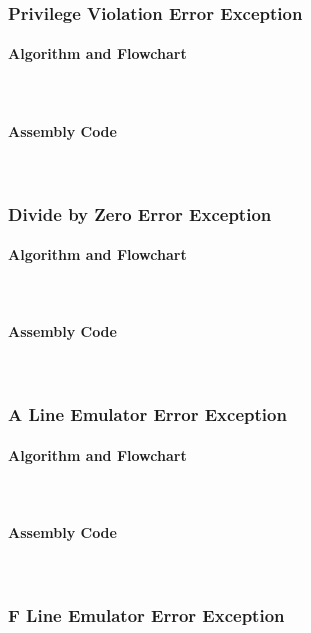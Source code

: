 \documentclass[12pt]{article}
\begin{document}
			\subsubsection{Privilege Violation Error Exception}
			\paragraph{Algorithm and Flowchart}~\\
			\paragraph{Assembly Code}~\\	
			
			\subsubsection{Divide by Zero Error Exception}
			\paragraph{Algorithm and Flowchart}~\\
			\paragraph{Assembly Code}~\\	
			
			\subsubsection{A Line Emulator Error Exception}
			\paragraph{Algorithm and Flowchart}~\\
			\paragraph{Assembly Code}~\\	
			
			\subsubsection{F Line Emulator Error Exception}
\end{document}
